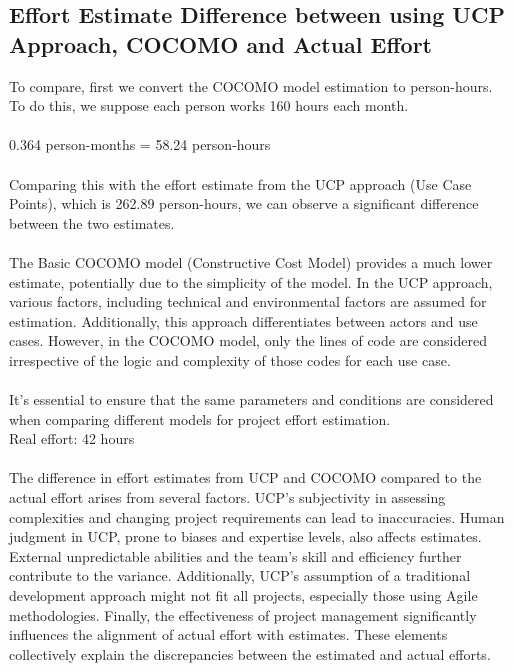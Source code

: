 \subsection{Effort Estimate Difference between using UCP Approach, COCOMO and Actual Effort}
To compare, first we convert the COCOMO model estimation to person-hours. To do this, we suppose each person works 160 hours each month.\\\\
0.364 person-months = 58.24 person-hours\\\\
Comparing this with the effort estimate from the UCP approach (Use Case Points), which is 262.89 person-hours, we can observe a significant difference between the two estimates.\\\\
The Basic COCOMO model (Constructive Cost Model) provides a much lower estimate, potentially due to the simplicity of the model. In the UCP approach, various factors, including technical and environmental factors are assumed for estimation. Additionally, this approach differentiates between actors and use cases. However, in the COCOMO model, only the lines of code are considered irrespective of the logic and complexity of those codes for each use case.\\\\
It's essential to ensure that the same parameters and conditions are considered when comparing different models for project effort estimation.
\\

Real effort: 42 hours\\\\
The difference in effort estimates from UCP and COCOMO compared to the actual effort arises from several factors. UCP's subjectivity in assessing complexities and changing project requirements can lead to inaccuracies. Human judgment in UCP, prone to biases and expertise levels, also affects estimates. External unpredictable abilities and the team's skill and efficiency further contribute to the variance. Additionally, UCP's assumption of a traditional development approach might not fit all projects, especially those using Agile methodologies. Finally, the effectiveness of project management significantly influences the alignment of actual effort with estimates. These elements collectively explain the discrepancies between the estimated and actual efforts.

\pagebreak
